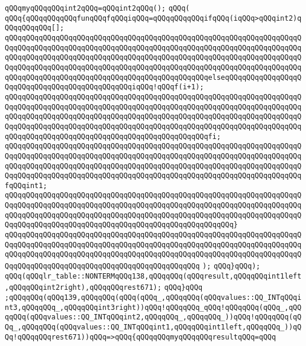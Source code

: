 \verb|qQQqmyqQQqqQQqint2qQQq=qQQqint2qQQq();|\newline
\verb|qQQq(|\newline
\verb|qQQq{qQQqqQQqqQQqfunqQQqfqQQqiqQQq=qQQqqQQqqQQqifqQQq(iqQQq>qQQqint2)qQQqqQQqqQQq[];|\newline
\verb|qQQqqQQqqQQqqQQqqQQqqQQqqQQqqQQqqQQqqQQqqQQqqQQqqQQqqQQqqQQqqQQqqQQqqQQqqQQqqQQqqQQqqQQqqQQqqQQqqQQqqQQqqQQqqQQqqQQqqQQqqQQqqQQqqQQqqQQqqQQqqQQqqQQqqQQqqQQqqQQqqQQqqQQqqQQqqQQqqQQqqQQqqQQqqQQqqQQqqQQqqQQqqQQqqQQqqQQqqQQqqQQqqQQqqQQqqQQqqQQqqQQqqQQqqQQqqQQqqQQqqQQqqQQqqQQqqQQqqQQqqQQqqQQqqQQqqQQqqQQqqQQqqQQqqQQqqQQqqQQqqQQqqQQqelseqQQqqQQqqQQqqQQqqQQqqQQqqQQqqQQqqQQqqQQqqQQqqQQqiqQQq!qQQqf(i+1);|\newline
\verb|qQQqqQQqqQQqqQQqqQQqqQQqqQQqqQQqqQQqqQQqqQQqqQQqqQQqqQQqqQQqqQQqqQQqqQQqqQQqqQQqqQQqqQQqqQQqqQQqqQQqqQQqqQQqqQQqqQQqqQQqqQQqqQQqqQQqqQQqqQQqqQQqqQQqqQQqqQQqqQQqqQQqqQQqqQQqqQQqqQQqqQQqqQQqqQQqqQQqqQQqqQQqqQQqqQQqqQQqqQQqqQQqqQQqqQQqqQQqqQQqqQQqqQQqqQQqqQQqqQQqqQQqqQQqqQQqqQQqqQQqqQQqqQQqqQQqqQQqqQQqqQQqqQQqqQQqqQQqqQQqqQQqqQQqfi;|\newline
\verb|qQQqqQQqqQQqqQQqqQQqqQQqqQQqqQQqqQQqqQQqqQQqqQQqqQQqqQQqqQQqqQQqqQQqqQQqqQQqqQQqqQQqqQQqqQQqqQQqqQQqqQQqqQQqqQQqqQQqqQQqqQQqqQQqqQQqqQQqqQQqqQQqqQQqqQQqqQQqqQQqqQQqqQQqqQQqqQQqqQQqqQQqqQQqqQQqqQQqqQQqqQQqqQQqqQQqqQQqqQQqqQQqqQQqqQQqqQQqqQQqqQQqqQQqqQQqqQQqqQQqqQQqqQQqqQQqqQQqqQQqfqQQqint1;|\newline
\verb|qQQqqQQqqQQqqQQqqQQqqQQqqQQqqQQqqQQqqQQqqQQqqQQqqQQqqQQqqQQqqQQqqQQqqQQqqQQqqQQqqQQqqQQqqQQqqQQqqQQqqQQqqQQqqQQqqQQqqQQqqQQqqQQqqQQqqQQqqQQqqQQqqQQqqQQqqQQqqQQqqQQqqQQqqQQqqQQqqQQqqQQqqQQqqQQqqQQqqQQqqQQqqQQqqQQqqQQqqQQqqQQqqQQqqQQqqQQqqQQqqQQqqQQqqQQqqQQqqQQqqQQq}|\newline
\verb|qQQqqQQqqQQqqQQqqQQqqQQqqQQqqQQqqQQqqQQqqQQqqQQqqQQqqQQqqQQqqQQqqQQqqQQqqQQqqQQqqQQqqQQqqQQqqQQqqQQqqQQqqQQqqQQqqQQqqQQqqQQqqQQqqQQqqQQqqQQqqQQqqQQqqQQqqQQqqQQqqQQqqQQqqQQqqQQqqQQqqQQqqQQqqQQqqQQqqQQqqQQqqQQqqQQqqQQqqQQqqQQqqQQqqQQqqQQqqQQqqQQqqQQqqQQqqQQq|\newline
\verb|);|\newline
\verb|qQQq}qQQq);|\newline
\verb|qQQq(qQQqlr_table::NONTERMqQQq138,qQQqqQQq(qQQqresult,qQQqqQQqint1left,qQQqqQQqint2right),qQQqqQQqrest671);|\newline
\verb|qQQq}qQQq|\newline
\verb|;qQQqqQQq(qQQq139,qQQqqQQq(qQQq(qQQq_,qQQqqQQq(qQQqvalues::QQ_INTqQQqint3,qQQqqQQq_,qQQqqQQqint3right))qQQq!qQQqqQQq_qQQq!qQQqqQQq(qQQq_,qQQqqQQq(qQQqvalues::QQ_INTqQQqint2,qQQqqQQq_,qQQqqQQq_))qQQq!qQQqqQQq(qQQq_,qQQqqQQq(qQQqvalues::QQ_INTqQQqint1,qQQqqQQqint1left,qQQqqQQq_))qQQq!qQQqqQQqrest671))qQQq=>qQQq{qQQqqQQqmyqQQqqQQqresultqQQq=qQQq|\newline
